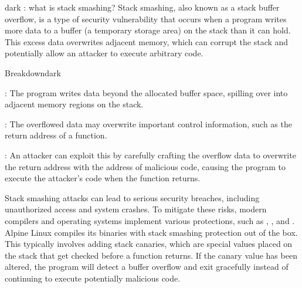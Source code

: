 \label{Stack Smashing Protection (SSP)}
\begin{baseBoxThree}{}{dark}
    \bigskip
    : what is stack smashing?
    Stack smashing, also known as a stack buffer overflow, is a type of security vulnerability that occurs when a program writes more data to a buffer (a temporary storage area) on the stack than it can hold.
    This excess data overwrites adjacent memory, which can corrupt the stack and potentially allow an attacker to execute arbitrary code.
    \bigskip
    \begin{baseBoxThree}{Breakdown}{dark}
        \smallskip
        \begin{posnexItemize}
            \item[\sA] : The program writes data beyond the allocated buffer space, spilling over into adjacent memory regions on the stack.
            \item[\sA] : The overflowed data may overwrite important control information, such as the return address of a function.
            \item[\sA] : An attacker can exploit this by carefully crafting the overflow data to overwrite the return address with the address of malicious code, causing the program to execute the attacker's code when the function returns.
        \end{posnexItemize}
        \smallskip
    \end{baseBoxThree}
    \smallskip
    Stack smashing attacks can lead to serious security breaches, including unauthorized access and system crashes.
    To mitigate these risks, modern compilers and operating systems implement various protections, such as , , and .
    \\

    Alpine Linux compiles its binaries with stack smashing protection out of the box.
    This typically involves adding stack canaries, which are special values placed on the stack that get checked before a function returns.
    If the canary value has been altered, the program will detect a buffer overflow and exit gracefully instead of continuing to execute potentially malicious code.
    \smallskip
\end{baseBoxThree}
